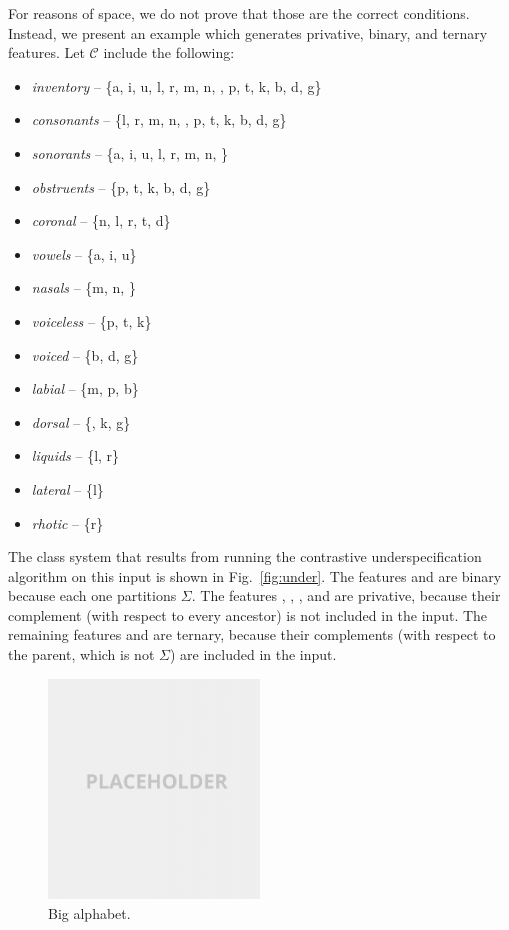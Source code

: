 \documentclass[11pt, oneside]{article}   	%
\begin{document}
\vspace{\baselineskip} For reasons of space, we do not prove that those are the correct conditions. Instead, we present an example which generates privative, binary, and ternary features. Let $\mathcal C$ include the following: \begin{itemize}
    \item \textit{inventory} -- \{a, i, u, l, r, m, n, , p, t, k, b, d, g\}
    \item \textit{consonants} -- \{l, r, m, n, , p, t, k, b, d, g\}
    \item \textit{sonorants} -- \{a, i, u, l, r, m, n, \}
    \item \textit{obstruents} -- \{p, t, k, b, d, g\}
    \item \textit{coronal} -- \{n, l, r, t, d\}
    \item \textit{vowels} -- \{a, i, u\}
    \item \textit{nasals} -- \{m, n, \}
    \item \textit{voiceless} -- \{p, t, k\}
    \item \textit{voiced} -- \{b, d, g\}
    \item \textit{labial} -- \{m, p, b\}
    \item \textit{dorsal} -- \{, k, g\}
    \item \textit{liquids} -- \{l, r\}
    \item \textit{lateral} -- \{l\}
    \item \textit{rhotic} -- \{r\}
    \end{itemize}
The class system that results from running the contrastive underspecification algorithm on this input is shown in Fig.~\ref{fig:under}. The features  and  are binary because each one partitions $\Sigma$. The features , , ,  and  are privative, because their complement (with respect to every ancestor) is not included in the input. The remaining features  and  are ternary, because their complements (with respect to the parent, which is not $\Sigma$) are included in the input.

\begin{figure}[h]
  \centering
  \includegraphics[width=0.5\textwidth]{placeholder.png}
  \caption{Big alphabet.}
  \label{fig:big_alphabet}
\end{figure}
\end{document}
